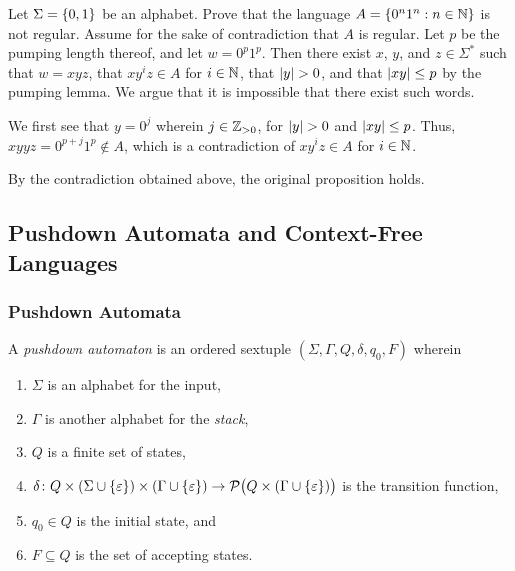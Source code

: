 \Bxr
  Let \(\Sigma = \{0, 1\}\) be an alphabet. Prove that the language \(A = \{0^n 1^n : n \in \mathbb{N}\}\) is not
  regular.
\Exr
\Bsl
  Assume for the sake of contradiction that \(A\) is regular. Let \(p\) be the pumping length thereof, and let \(w = 0^p
  1^p\). Then there exist \(x\), \(y\), and \(z \in \Sigma^*\) such that \(w = x y z\), that \(x y^i z \in A\) for
  \(i \in \mathbb{N}\), that \(\lvert y\rvert > 0\), and that \(\lvert x y\rvert \leq p\) by the pumping lemma. We argue that it is
  impossible that there exist such words.

  We first see that \(y = 0^j\) wherein \(j \in \mathbb{Z}_{>0}\), for \(\lvert y\rvert > 0\) and \(\lvert x y\rvert \leq p\). Thus, \(x y y z
  = 0^{p + j} 1^p \not\in A\), which is a contradiction of \(x y^i z \in A\) for \(i \in \mathbb{N}\).

  By the contradiction obtained above, the original proposition holds.
\Esl

\subsection{Pushdown Automata and Context-Free Languages}

\subsubsection{Pushdown Automata}

\Bdf
  A \emph{pushdown automaton} is an ordered sextuple \((\Sigma, \Gamma, Q, \delta, q_0, F)\) wherein
  \begin{enumerate}
    \item \(\Sigma\) is an alphabet for the input,
    \item \(\Gamma\) is another alphabet for the \emph{stack},
    \item \(Q\) is a finite set of states,
    \item \(\delta\colon Q \times (\Sigma \cup \{\varepsilon\}) \times (\Gamma \cup \{\varepsilon\})\to\mathcal{P}\big(Q
    \times (\Gamma \cup \{\varepsilon\})\big)\) is the transition function,
    \item \(q_0 \in Q\) is the initial state, and
    \item \(F \subseteq Q\) is the set of accepting states.
  \end{enumerate}
\Edf

